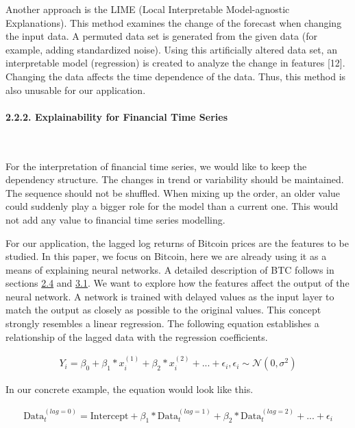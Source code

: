 \documentclass[
]{article}
\begin{document}
Another approach is the LIME (Local Interpretable Model-agnostic
Explanations). This method examines the change of the forecast when
changing the input data. A permuted data set is generated from the given
data (for example, adding standardized noise). Using this artificially
altered data set, an interpretable model (regression) is created to
analyze the change in features {[}12{]}. Changing the data affects the
time dependence of the data. Thus, this method is also unusable for our
application.

\newpage

\hypertarget{xai_finance}{%
\paragraph{2.2.2. Explainability for Financial Time
Series}\label{xai_finance}}

~

For the interpretation of financial time series, we would like to keep
the dependency structure. The changes in trend or variability should be
maintained. The sequence should not be shuffled. When mixing up the
order, an older value could suddenly play a bigger role for the model
than a current one. This would not add any value to financial time
series modelling.

For our application, the lagged log returns of Bitcoin prices are the
features to be studied. In this paper, we focus on Bitcoin, here we are
already using it as a means of explaining neural networks. A detailed
description of BTC follows in sections \protect\hyperlink{bitcoin}{2.4}
and \protect\hyperlink{data_exploration}{3.1}. We want to explore how
the features affect the output of the neural network. A network is
trained with delayed values as the input layer to match the output as
closely as possible to the original values. This concept strongly
resembles a linear regression. The following equation establishes a
relationship of the lagged data with the regression coefficients.

\begin{align} \label{eq:lm1}
  Y_{i}=\beta_{0}+\beta_{1}*x_{i}^{(1)}+\beta_{2}*x_{i}^{(2)} + ... + \epsilon_{i}, \epsilon_{i} \sim \mathcal{N}(0, \sigma^{2})
\end{align}  

In our concrete example, the equation would look like this.

\begin{align} \label{eq:lm2}
 \text{Data}^{(lag=0)}_{t}=\text{Intercept}+\beta_{1}*\text{Data}^{(lag=1)}_{t}+\beta_{2}*\text{Data}^{(lag=2)}_{t} + ... + \epsilon_{i}
\end{align}  
\end{document}
